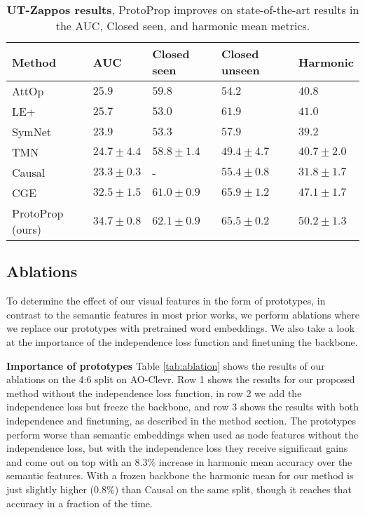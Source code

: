 \documentclass{article}
\begin{document}
\begin{table}[]
\centering
\caption{\textbf{UT-Zappos results}, ProtoProp improves on state-of-the-art results in the AUC, Closed seen, and harmonic mean metrics.}
\label{tab:results_zappos}
\begin{tabular}{lllll}

\hline
Method           & AUC           & Closed seen   & Closed unseen & Harmonic \\ \hline
AttOp \citep{nagarajan2018attributes} & $25.9$          & $59.8$          & $54.2$          & $40.8$          \\
LE+ \citep{misra2017red}  & $25.7$          & $53.0$          & $61.9$          & $41.0$          \\
SymNet \citep{li2020symmetry} & $23.9$          & $53.3$          & $57.9$          & $39.2$          \\
TMN \citep{purushwalkam2019task} & $24.7 \pm 4.4$          & $58.8 \pm 1.4$          & $49.4 \pm 4.7$          &  $40.7 \pm 2.0$        \\
Causal \citep{atzmon2020causal} & $23.3 \pm 0.3$     & -             & $55.4 \pm 0.8$     & $31.8 \pm 1.7$          \\
CGE \citep{naeem2021learning} & $32.5 \pm 1.5$ & $61.0 \pm 0.9$ & $\mathbf{65.9 \pm 1.2}$ & $47.1 \pm 1.7$ \\ \hline
ProtoProp (ours) &  $\mathbf{34.7 \pm 0.8}$ & $\mathbf{62.1 \pm 0.9}$ & $65.5 \pm 0.2$ & $\mathbf{50.2 \pm 1.3}$ \\ \hline
\end{tabular}
\end{table}

\subsection{Ablations}
To determine the effect of our visual features in the form of prototypes, in contrast to the semantic features in most prior works, we perform ablations where we replace our prototypes with pretrained word embeddings. We also take a look at the importance of the independence loss function and finetuning the backbone.

\textbf{Importance of prototypes} Table \ref{tab:ablation} shows the results of our ablations on the 4:6 split on AO-Clevr. Row 1 shows the results for our proposed method without the independence loss function, in row 2 we add the independence loss but freeze the backbone, and row 3 shows the results with both independence and finetuning, as described in the method section. The prototypes perform worse than semantic embeddings when used as node features without the independence loss, but with the independence loss they receive significant gains and come out on top with an $8.3\%$ increase in harmonic mean accuracy over the semantic features. With a frozen backbone the harmonic mean for our method is just slightly higher ($0.8\%$) than Causal on the same split, though it reaches that accuracy in a fraction of the time. 
\end{document}
